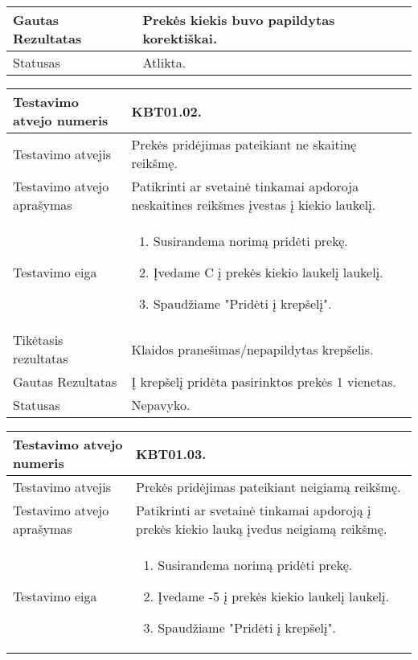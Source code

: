 \documentclass{VUMIFPSkursinis}
\begin{document}
\begin{center}
\begin{tabular}{ |p{5cm}|p{10cm}|}
	Gautas Rezultatas & Prekės kiekis buvo papildytas korektiškai. \\ \hline
	Statusas & Atlikta. \\ \hline
	\end{tabular}
\vspace{1cm}
\begin{tabular}{ |p{5cm}|p{10cm}|}
	\hline
	Testavimo atvejo numeris & KBT01.02. \\ \hline
	Testavimo atvejis & Prekės pridėjimas pateikiant ne skaitinę reikšmę.\\ \hline
	Testavimo atvejo aprašymas & Patikrinti ar svetainė tinkamai apdoroja neskaitines reikšmes įvestas į kiekio laukelį. \\ \hline
	Testavimo eiga & 
	\begin{enumerate} 
		\item Susirandema norimą pridėti prekę.
		\item Įvedame C į prekės kiekio laukelį laukelį.
		\item Spaudžiame "Pridėti į krepšelį".
	\end{enumerate} \\ \hline
	Tikėtasis rezultatas & Klaidos pranešimas/nepapildytas krepšelis. \\ \hline
	Gautas Rezultatas & Į krepšelį pridėta pasirinktos prekės 1 vienetas. \\ \hline
	Statusas & Nepavyko. \\ \hline
	\end{tabular}
\vspace{1cm}
\begin{tabular}{ |p{5cm}|p{10cm}|}
	\hline
	Testavimo atvejo numeris & KBT01.03. \\ \hline
	Testavimo atvejis & Prekės pridėjimas pateikiant neigiamą reikšmę. \\ \hline
	Testavimo atvejo aprašymas & Patikrinti ar svetainė tinkamai apdoroją į prekės kiekio lauką įvedus neigiamą reikšmę. \\ \hline
	Testavimo eiga &
	\begin{enumerate} 
		\item Susirandema norimą pridėti prekę.
		\item Įvedame -5 į prekės kiekio laukelį laukelį.
		\item Spaudžiame "Pridėti į krepšelį".
	\end{enumerate} \\ \hline

\end{tabular}
\end{center}
\end{document}
